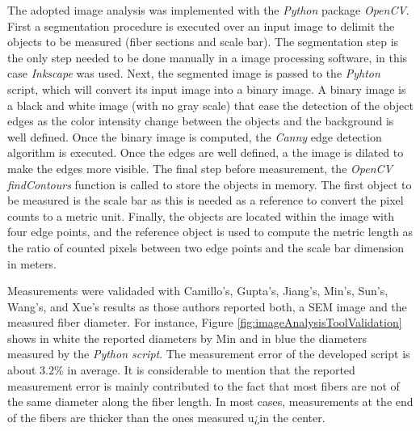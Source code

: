 The adopted image analysis was implemented with the \emph{Python} package \emph{OpenCV}. First a segmentation procedure is executed over an input image to delimit the objects to be measured (fiber sections and scale bar). The segmentation step is the only step needed to be done manually in a image processing software, in this case \emph{Inkscape} was used. Next, the segmented image is passed to the \emph{Pyhton} script, which will convert its input image into a binary image. A binary image is a black and white image (with no gray scale) that ease the detection of the object edges as the color intensity change between the objects and the background is well defined. Once the binary image is computed, the \emph{Canny} edge detection algorithm is executed. Once the edges are well defined, a the image is dilated to make the edges more visible. The final step before measurement, the \emph{OpenCV} \emph{findContours} function is called to store the objects in memory. The first object to be measured is the scale bar as this is needed as a reference to convert the pixel counts to a metric unit. Finally, the objects are located within the image with four edge points, and the reference object is used to compute the metric length as the ratio of counted pixels between two edge points and the scale bar dimension in meters.

Measurements were validaded with Camillo's, Gupta's, Jiang's, Min's, Sun's, Wang's, and Xue's \cite{Camillo2013, Gupta2007, Jiang2018, Min2013, Sun2006a, Wang2015, Xue2014} results as those authors reported both, a SEM image and the measured fiber diameter. For instance, Figure \ref{fig:imageAnalysisToolValidation} shows in white the reported diameters by Min and in blue the diameters measured by the \emph{Python script}. The measurement error of the developed script is about $3.2\%$ in average. It is considerable to mention that the reported measurement error is mainly contributed to the fact that most fibers are not of the same diameter along the fiber length. In most cases, measurements at the end of the fibers are thicker than the ones measured u¿in the center.

